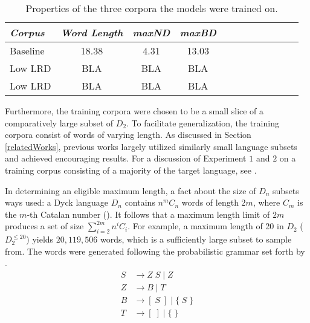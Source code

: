 \begin{table}
	\begin{tabularx}{\textwidth}{@{}l*{10}{C}c@{}}
		\toprule 		
		\textit{Corpus} & \textit{Word Length} & \textit{maxND} & \textit{maxBD} \\ 
		\toprule 
		Baseline & 18.38 & 4.31 & 13.03 \\
		Low LRD & BLA & BLA & BLA \\
		Low LRD & BLA & BLA & BLA \\
		\bottomrule
	\end{tabularx}
	\caption[Training corpora properties]{Properties of the three corpora the models were trained on.}
	\label{tab:Corpora}
\end{table}

Furthermore, the training corpora were chosen to be a small slice of a comparatively large subset of $D_{2}$. To facilitate generalization, the training corpora consist of words of varying length. As discussed in Section \ref{relatedWorks}, previous works largely utilized similarly small language subsets and achieved encouraging results. For a discussion of Experiment $1$ and $2$ on a training corpus consisting of a majority of the target language, see \cite{Bernardy2018}.

In determining an eligible maximum length, a fact about the size of $D_{n}$ subsets ways used: a Dyck language $D_{n}$ contains $n^mC_{n}$ words of length $2m$, where $C_{m}$ is the $m$-th Catalan number (\cite{Skachkova2018}). It follows that a maximum length limit of $2m$ produces a set of size $\sum_{i=2}^{2m}n^{i}C_{i}$. For example, a maximum length of 20 in $D_{2}$ ($D_{2}^{\leq 20}$) yields $20,119,506$ words, which is a sufficiently large subset to sample from. The words were generated following the probabilistic grammar set forth by \cite{Sennhauser2018}.
\begin{align*}
	S &\rightarrow Z \; S \; \vert \; Z \\
	Z &\rightarrow B \; \vert \; T \\
	B &\rightarrow [ \; S \; ] \; \vert \; \lbrace \; S \; \rbrace \\
	T &\rightarrow [ \; ] \; \vert \; \lbrace \; \rbrace
\end{align*}

